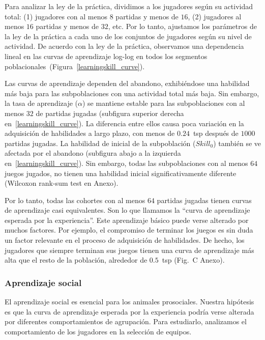 \documentclass[a4paper,10pt]{book}
\theoremstyle{definition}
\begin{document}

Para analizar la ley de la práctica, dividimos a los jugadores seg\'un su actividad total: (1) jugadores con al menos $8$ partidas y menos de $16$, (2) jugadores al menos $16$ partidas y menos de $32$, etc.
%
Por lo tanto, ajustamos los parámetros de la ley de la práctica a cada uno de los conjuntos de jugadores seg\'un su nivel de actividad.
%
De acuerdo con la ley de la práctica, observamos una dependencia lineal en las curvas de aprendizaje log-log en todos los segmentos poblacionales~(Figura~\ref{learningskill_curve}).


Las curvas de aprendizaje dependen del abandono, exhibiéndose una habilidad más baja para las subpoblaciones con una actividad total más baja.
%
Sin embargo, la tasa de aprendizaje ($\alpha$) se mantiene estable para las subpoblaciones con al menos $32$ de partidas jugadas (subfigura superior derecha en~\ref{learningskill_curve}).
%
La diferencia entre ellos causa poca variaci\'on en la adquisici\'on de habilidades a largo plazo, con menos de $0.24$~tsp después de $1000$ partidas jugadas.
%
La habilidad de inicial de la subpoblaci\'on ($Skill_0$) también se ve afectada por el abandono (subfigura abajo a la izquierda en~\ref{learningskill_curve}).
%
Sin embargo, todas las subpoblaciones con al menos $64$ juegos jugados, no tienen una habilidad inicial significativamente diferente (Wilcoxon rank-sum test en Anexo). 


Por lo tanto, todas las cohortes con al menos $64$ partidas jugadas tienen curvas de aprendizaje casi equivalentes.
%
Son lo que llamamos la ``curva de aprendizaje esperada por la experiencia''.
%
Este aprendizaje básico puede verse alterado por muchos factores.
%
Por ejemplo, el compromiso de terminar los juegos es sin duda un factor relevante en el proceso de adquisici\'on de habilidades.
%
De hecho, los jugadores que siempre terminan sus juegos tienen una curva de aprendizaje más alta que el resto de la poblaci\'on, alrededor de $0.5$~tsp (Fig.~C Anexo).

\subsubsection{Aprendizaje social}

El aprendizaje social es esencial para los animales prosociales.
%
Nuestra hip\'otesis es que la curva de aprendizaje esperada por la experiencia podr\'ia verse alterada por diferentes comportamientos de agrupaci\'on.
%
Para estudiarlo, analizamos el comportamiento de los jugadores en la selecci\'on de equipos.
\end{document}
